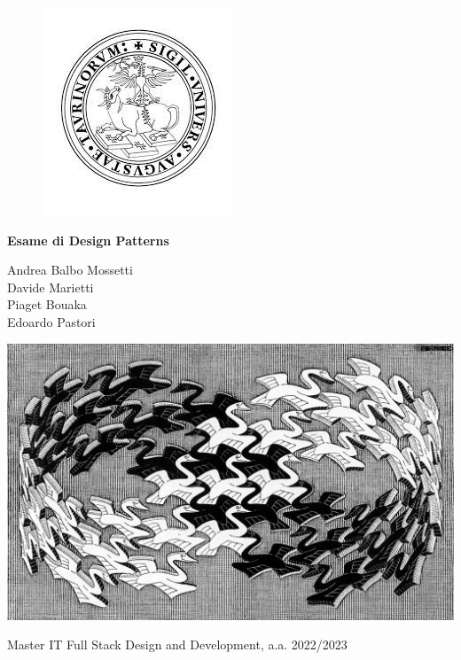 \documentclass[12pt]{article}
\begin{document}

\begin{figure}
    \centering
    \includegraphics[width=0.2\linewidth]{images/unito_logo.jpg}
\end{figure}

\begin{center}
    \vspace{5ex}
    {\huge \textbf{Esame di Design Patterns}}
    \vspace{5ex}
\end{center}

\begin{center}
    Andrea Balbo Mossetti \\
    Davide Marietti \\
    Piaget Bouaka \\
    Edoardo Pastori
\end{center}

\vspace{10ex}

\begin{center}

\includegraphics[scale=2]{design_pattern.jpeg}

\vspace{20ex}

Master IT Full Stack Design and Development, a.a. 2022/2023

\end{center}
\end{document}
